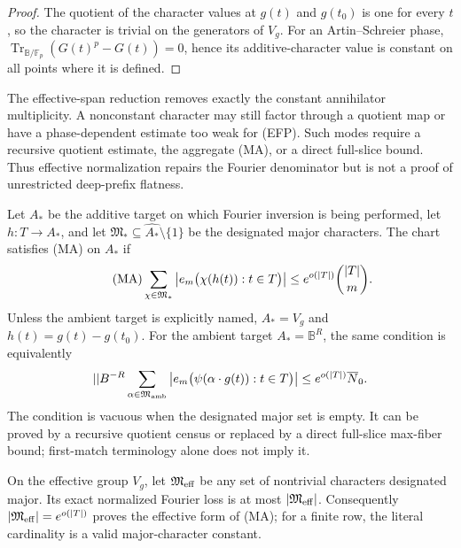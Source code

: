 \documentclass[11pt,a4paper]{amsart}
\numberwithin{equation}{section}
\theoremstyle{remark}
\DeclareMathOperator{\Tr}{Tr}\DeclareMathOperator{\Gal}{Gal}\DeclareMathOperator{\Res}{Res}
\newcommand{\F}{\mathbb F}\newcommand{\B}{\mathbb B}\newcommand{\K}{\mathbb K}\newcommand{\Z}{\mathbb Z}
\begin{document}
\begin{proof}
The quotient of the character values at \(g(t)\) and \(g(t_0)\) is one
for every \(t\), so the character is trivial on the generators of
\(V_g\).  For an Artin--Schreier phase,
\(\Tr_{\B/\F_p}(G(t)^p-G(t))=0\), hence its additive-character value is
constant on all points where it is defined.
\end{proof}

\begin{remark}
The effective-span reduction removes exactly the constant annihilator
multiplicity.  A nonconstant character may still factor through a quotient
map or have a phase-dependent estimate too weak for \textup{(EFP)}.  Such
modes require a recursive quotient estimate, the aggregate
\textup{(MA)}, or a direct full-slice bound.  Thus effective normalization
repairs the Fourier denominator but is not a proof of unrestricted deep-prefix
flatness.
\end{remark}

\begin{definition}
\label{def:major-arc-aggregate}
Let \(A_*\) be the additive target on which Fourier inversion is being
performed, let \(h:T\to A_*\), and let
\(\mathfrak M_*\subseteq\widehat{A_*}\setminus\{1\}\) be the designated
major characters.  The chart satisfies \textup{(MA)} on \(A_*\) if
\[
 \tag{MA}\label{eq:major-arc-aggregate}
 \sum_{\chi\in\mathfrak M_*}
 \left|e_m\bigl(\chi(h(t)):t\in T\bigr)\right|
 \le e^{o(\lvert T\rvert)}\binom{\lvert T\rvert}m .
\]
Unless the ambient target is explicitly named, \(A_*=V_g\) and
\(h(t)=g(t)-g(t_0)\).  For the ambient target \(A_*=\B^R\), the same
condition is equivalently
\[
 \abs\B^{-R}\sum_{\alpha\in\mathfrak M_{\rm amb}}
 \left|e_m\bigl(\psi(\alpha\cdot g(t)):t\in T\bigr)\right|
 \le e^{o(\abs T)}\barN_0.
\]
The condition is vacuous when the designated major set is empty.  It can
be proved by a recursive quotient census or replaced by a direct
full-slice max-fiber bound; first-match terminology alone does not imply
it.
\end{definition}

\begin{lemma}
\label{lem:sparse-major-payment}
On the effective group \(V_g\), let \(\mathfrak M_{\rm eff}\) be any set
of nontrivial characters designated major.  Its exact normalized Fourier
loss is at most \(\lvert \mathfrak M_{\rm eff}\rvert\).  Consequently
\(\lvert \mathfrak M_{\rm eff}\rvert=e^{o(\lvert T\rvert)}\) proves the effective form
of \textup{(MA)}; for a finite row, the literal cardinality is a valid
major-character constant.
\end{lemma}
\end{document}
